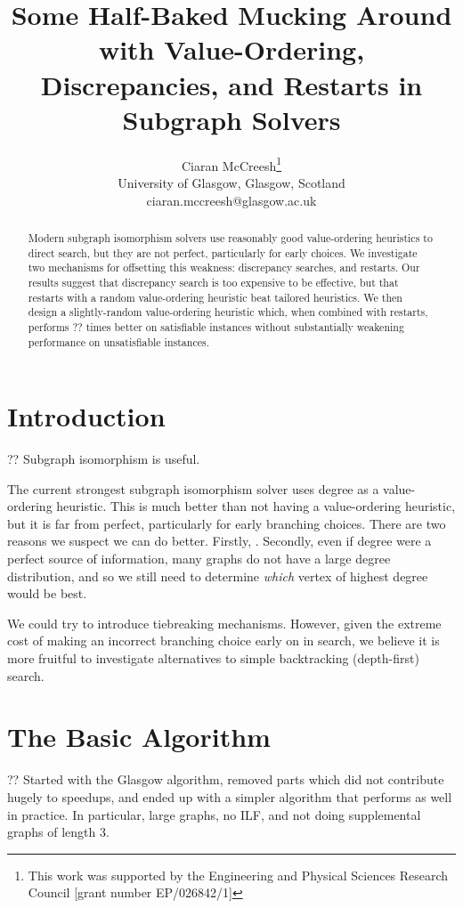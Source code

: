 \documentclass{article}
\title{Some Half-Baked Mucking Around with Value-Ordering, Discrepancies, and Restarts in Subgraph Solvers}
\author{Ciaran McCreesh\thanks{This work was supported by the Engineering and Physical Sciences
    Research Council [grant number EP/026842/1]}\\ University of Glasgow, Glasgow, Scotland \\
    ciaran.mccreesh@glasgow.ac.uk}
\begin{document}
\maketitle

\begin{abstract}
    Modern subgraph isomorphism solvers use reasonably good value-ordering heuristics to direct
    search, but they are not perfect, particularly for early choices. We investigate two mechanisms
    for offsetting this weakness: discrepancy searches, and restarts. Our results suggest that
    discrepancy search is too expensive to be effective, but that restarts with a random
    value-ordering heuristic beat tailored heuristics. We then design a slightly-random
    value-ordering heuristic which, when combined with restarts, performs ?? times better on
    satisfiable instances without substantially weakening performance on unsatisfiable instances.
\end{abstract}

\section{Introduction}

?? Subgraph isomorphism is useful.

The current strongest subgraph isomorphism solver uses degree as a value-ordering heuristic. This is
much better than not having a value-ordering heuristic, but it is far from perfect, particularly for
early branching choices. There are two reasons we suspect we can do better. Firstly, . Secondly, even if degree
were a perfect source of information, many graphs do not have a large degree distribution, and so we
still need to determine \emph{which} vertex of highest degree would be best.

We could try to introduce tiebreaking mechanisms. However, given the extreme cost of making an
incorrect branching choice early on in search, we believe it is more fruitful to investigate
alternatives to simple backtracking (depth-first) search.

\section{The Basic Algorithm}

?? Started with the Glasgow algorithm, removed parts which did not contribute hugely to speedups,
and ended up with a simpler algorithm that performs as well in practice. In particular, large
graphs, no ILF, and not doing supplemental graphs of length 3.
\end{document}

